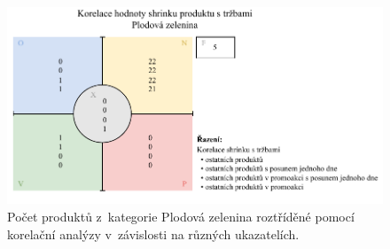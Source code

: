 \begin{figure}[h!]
    \centering
    \captionsetup{justification=centering}
    \includegraphics[width=\textwidth]{obrazky/kor_zel.pdf}
    \caption{Počet produktů z~kategorie Plodová zelenina roztříděné pomocí korelační analýzy v~závislosti na různých ukazatelích.}
    \label{obr:kategCorrPorovnaniZel}
\end{figure}


